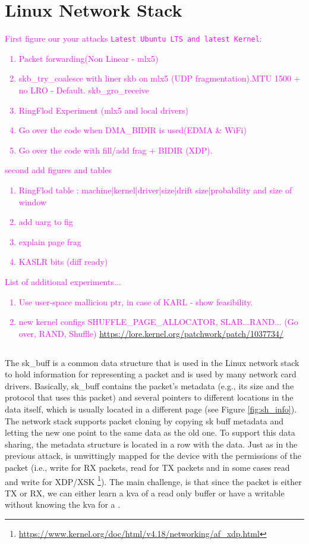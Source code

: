 \section{Linux Network Stack}
\textcolor{magenta}{First figure our your attacks \texttt{Latest Ubuntu LTS and latest Kernel}:\begin{enumerate}
    \item Packet forwarding(Non Linear - mlx5)
    \item skb\_try\_coalesce with liner skb on mlx5 (UDP fragmentation).\newline MTU 1500 + no LRO - Default.\newline
    skb\_gro\_receive
    \item RingFlod Experiment (mlx5 and local drivers)
    \item Go over the code when DMA\_BIDIR is used(EDMA \& WiFi)
    \item Go over the code with fill/add frag + BIDIR (XDP).
\end{enumerate}
second add figures and tables
\begin{enumerate}
    \item RingFlod table : machine|kernel|driver|size|drift size|probability and size of window
    \item add uarg to \shinfo fig
    \item explain page frag
    \item KASLR bits (diff ready)
\end{enumerate}
List of additional experiments...
\begin{enumerate}
    \item Use user-space malliciou ptr, in case of KARL - show feasibility.
    \item new kernel configs SHUFFLE\_PAGE\_ALLOCATOR, SLAB...RAND... (Go over, RAND, Shuffle)
    \url{https://lore.kernel.org/patchwork/patch/1037734/}
\end{enumerate}}
\subsection{\shinfo}
The sk\_buff is a common data structure that is used in the Linux network stack to hold information for representing a packet and is used by many network card drivers. Basically, sk\_buff contains the packet’s metadata (e.g., its size and the protocol that uses this packet) and several pointers to different locations in the data itself, which is usually located in a different page (see Figure \ref{fig:sh_info}). The network stack supports packet cloning by copying sk buff metadata and letting the new one point to the same data as the old one. To support this data sharing, the \shinfo metadata structure is located in a row with the data. Just as in the previous attack, \shinfo is unwittingly mapped for the device with the permissions of the packet (i.e., write for RX packets, read for TX packets and in some cases read and write for XDP/XSK \footnote{\url{https://www.kernel.org/doc/html/v4.18/networking/af_xdp.html}}). The main challenge, is that since the packet is either TX or RX, we can either learn a kva of a read only buffer or have a writable \shinfo without knowing the kva for a \mabaf.

